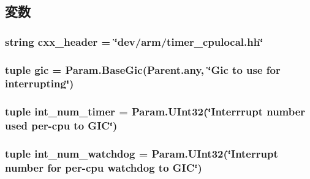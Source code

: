 \subsection{変数}
\hypertarget{classRealView_1_1CpuLocalTimer_a17da7064bc5c518791f0c891eff05fda}{
\subsubsection[{cxx\_\-header}]{\setlength{\rightskip}{0pt plus 5cm}string {\bf cxx\_\-header} = \char`\"{}dev/arm/timer\_\-cpulocal.hh\char`\"{}}}
\label{classRealView_1_1CpuLocalTimer_a17da7064bc5c518791f0c891eff05fda}
\hypertarget{classRealView_1_1CpuLocalTimer_a40243beb62d217c3a9e35801ae739fd0}{
\subsubsection[{gic}]{\setlength{\rightskip}{0pt plus 5cm}tuple {\bf gic} = Param.BaseGic(Parent.any, \char`\"{}Gic to use for interrupting\char`\"{})}}
\label{classRealView_1_1CpuLocalTimer_a40243beb62d217c3a9e35801ae739fd0}
\hypertarget{classRealView_1_1CpuLocalTimer_a41d80387d29e486234ca29aa8a7b1a79}{
\subsubsection[{int\_\-num\_\-timer}]{\setlength{\rightskip}{0pt plus 5cm}tuple {\bf int\_\-num\_\-timer} = Param.UInt32(\char`\"{}Interrrupt number used per-\/cpu to GIC\char`\"{})}}
\label{classRealView_1_1CpuLocalTimer_a41d80387d29e486234ca29aa8a7b1a79}
\hypertarget{classRealView_1_1CpuLocalTimer_ac9a716c5fa1dc45c2d9302efdab478f1}{
\subsubsection[{int\_\-num\_\-watchdog}]{\setlength{\rightskip}{0pt plus 5cm}tuple {\bf int\_\-num\_\-watchdog} = Param.UInt32(\char`\"{}Interrupt number for per-\/cpu watchdog to GIC\char`\"{})}}
